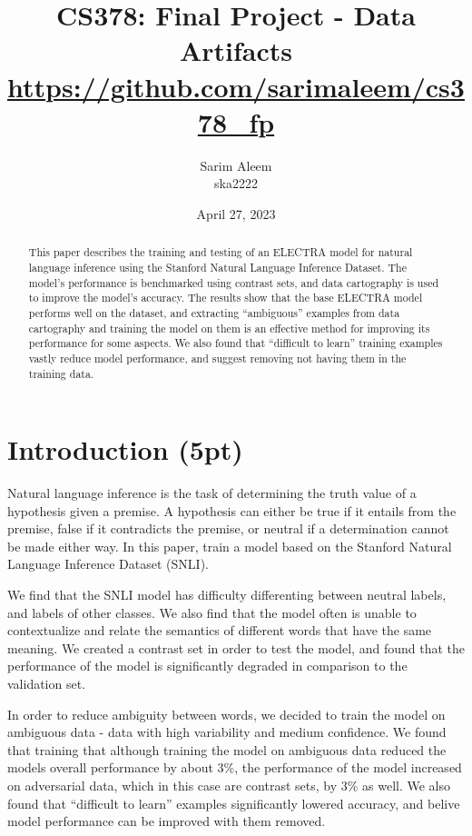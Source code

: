 \documentclass[twocolumn]{article}
\title{CS378: Final Project - Data Artifacts \\ \url{https://github.com/sarimaleem/cs378_fp}}
\author{Sarim Aleem \\ ska2222}
\date{April 27, 2023}
\begin{document}
\maketitle


\begin{abstract}

This paper describes the training and testing of an ELECTRA model for natural
language inference using the Stanford Natural Language Inference Dataset. The
model's performance is benchmarked using contrast sets, and data cartography is
used to improve the model's accuracy. The results show that the base ELECTRA
model performs well on the dataset, and extracting \enquote{ambiguous} examples
from data cartography and training the model on them is an effective method for
improving its performance for some aspects.  We also found that
\enquote{difficult to learn} training examples vastly reduce model performance,
and suggest removing not having them in the training data.

\end{abstract}

\section{Introduction (5pt)}

Natural language inference is the task of determining the truth value of a
hypothesis given a premise. A hypothesis can either be true if it entails from
the premise, false if it contradicts the premise, or neutral if a determination
cannot be made either way. In this paper, train a model based on the Stanford
Natural Language Inference Dataset (SNLI).

We find that the SNLI model has difficulty differenting between neutral labels,
and labels of other classes. We also find that the model often is unable to
contextualize and relate the semantics of different words that have the same
meaning. We created a contrast set in order to test the model, and found that
the performance of the model is significantly degraded in comparison to the
validation set.

In order to reduce ambiguity between words, we decided to train the model on
ambiguous data - data with high variability and medium confidence. We found that
training that although training the model on ambiguous data reduced the models
overall performance by about 3\%, the performance of the model increased on
adversarial data, which in this case are contrast sets, by 3\% as well. We also
found that \enquote{difficult to learn} examples significantly lowered accuracy,
and belive model performance can be improved with them removed.
\end{document}
